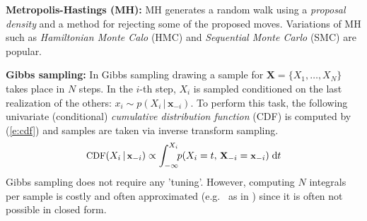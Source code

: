 \documentclass[]{article}
\newcommand{\bvec}[1]{\textbf{#1}}
\newcommand{\pr}{p}
\newcommand{\dd}{\;\mathrm{d}} %
\begin{document}
{\bf Metropolis-Hastings (MH):}
MH \citep{metropolis1953equation} generates a random walk using a \emph{proposal density} and a method for rejecting some of the proposed moves.
Variations of MH such as \emph{Hamiltonian Monte Calo} (HMC) \citep{neal2011mcmc}  
and \emph{Sequential Monte Carlo} (SMC) \citep{del2006sequential} are popular. 




{\bf Gibbs sampling:}
 In Gibbs  sampling \citep{geman1984stochastic} drawing a sample for $\bvec{X} = \{X_1, \ldots, X_N\}$ takes place in $N$ steps.
In the $i$-th step, $X_i$ is sampled conditioned on the last realization of the others:
$x_i \sim \pr(X_i \,|\, \bvec{x}_{-i})$. 
To perform this task, the following univariate (conditional) \emph{cumulative distribution function} (CDF)
is computed by (\ref{e:cdf}) and samples are taken via inverse transform sampling. 
\begin{equation} \footnotesize
\label{e:cdf}
\text{CDF}(X_i  \,|\, \bvec{x}_{-i}) 
\propto
\int_{-\infty}^{X_i} \!\! \pr(X_i = t, \,\bvec{X}_{-i} = \bvec{x}_{-i})  \dd  t
\end{equation} 
Gibbs sampling does not require any 'tuning'. 
However, computing $N$ integrals per sample is costly and often approximated 
(e.g.\ %
as in \citep{gilks1992adaptive})
since it is often not possible in closed form.  
 



\end{document}
